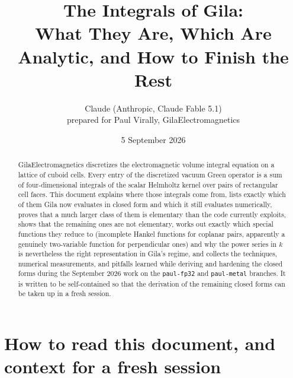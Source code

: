 \documentclass[11pt]{article}
\title{The Integrals of Gila:\\ What They Are, Which Are Analytic, and How to Finish the Rest}
\author{Claude (Anthropic, Claude Fable 5.1)\\[2pt]\small prepared for Paul Virally, GilaElectromagnetics}
\date{5 September 2026}
\theoremstyle{remark}
\newcommand{\code}[1]{\texttt{#1}}
\begin{document}
\maketitle

\begin{abstract}
GilaElectromagnetics discretizes the electromagnetic volume integral equation on a
lattice of cuboid cells. Every entry of the discretized vacuum Green operator is a
sum of four-dimensional integrals of the scalar Helmholtz kernel over pairs of
rectangular cell faces. This document explains where those integrals come from, lists
exactly which of them Gila now evaluates in closed form and which it still evaluates
numerically, proves that a much larger class of them is elementary than the code
currently exploits, shows that the remaining ones are not elementary, works out exactly which special
functions they reduce to (incomplete Hankel functions for coplanar pairs, apparently a
genuinely two-variable function for perpendicular ones) and why the power series in
$k$ is nevertheless the right representation in Gila's regime, and collects the techniques, numerical measurements,
and pitfalls learned while deriving and hardening the closed forms during the
September 2026 work on the \code{paul-fp32} and \code{paul-metal} branches. It is
written to be self-contained so that the derivation of the remaining closed forms can
be taken up in a fresh session.
\end{abstract}

\tableofcontents

\section{How to read this document, and context for a fresh session}
\end{document}
